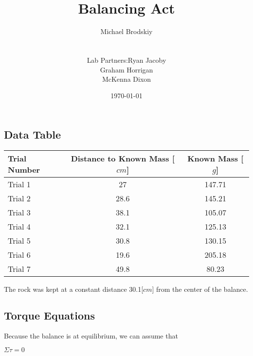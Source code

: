 \documentclass[12pt]{article}
\title{Balancing Act}
\author{Michael Brodskiy\\\\\begin{tabular}{l l} Lab Partners: & Ryan Jacoby\\& Graham Horrigan\\& McKenna Dixon\end{tabular}}
\date{\today}
\begin{document}
\maketitle

\begin{center}
\section{Data Table} 
\end{center}
\begin{center}
    

\vspace{16pt}
\begin{tabular}{|l|c|c|}
    \hline
    Trial Number & Distance to Known Mass [$cm$] & Known Mass [$g$] \\
    \hline
    Trial 1 & 27 & 147.71 \\
    \hline
    Trial 2 & 28.6 & 145.21 \\
    \hline
    Trial 3 & 38.1 & 105.07 \\
    \hline
    Trial 4 & 32.1 & 125.13 \\
    \hline
    Trial 5 & 30.8 & 130.15 \\
    \hline
    Trial 6 & 19.6 & 205.18 \\
    \hline
    Trial 7 & 49.8 & 80.23 \\
    \hline
\end{tabular}
\vspace{16pt}
\end{center}

The rock was kept at a constant distance 30.1[$cm$] from the center of the balance.


\begin{center}

\section{Torque Equations}

\end{center}

\begin{justify}

Because the balance is at equilibrium, we can assume that

\end{justify}

\newline

\begin{center}

$\Sigma\tau = 0$

\end{center}
\end{document}
